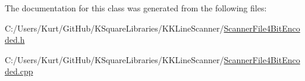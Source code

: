 The documentation for this class was generated from the following files\+:\begin{DoxyCompactItemize}
\item 
C\+:/\+Users/\+Kurt/\+Git\+Hub/\+K\+Square\+Libraries/\+K\+K\+Line\+Scanner/\hyperlink{_scanner_file4_bit_encoded_8h}{Scanner\+File4\+Bit\+Encoded.\+h}\item 
C\+:/\+Users/\+Kurt/\+Git\+Hub/\+K\+Square\+Libraries/\+K\+K\+Line\+Scanner/\hyperlink{_scanner_file4_bit_encoded_8cpp}{Scanner\+File4\+Bit\+Encoded.\+cpp}\end{DoxyCompactItemize}
